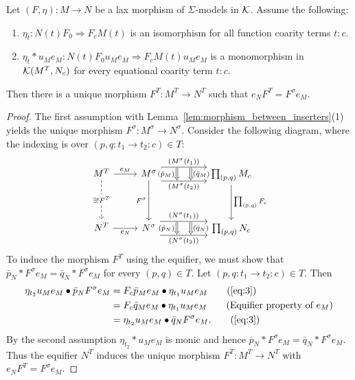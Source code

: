 \begin{theorem}\label{thm:induced_morphism_between_algebras}
   Let $(F,\eta)\colon M\to N$ be a lax morphism of $\Sigma$-models in $\mathcal{K}$. Assume the following:
\begin{enumerate}
   \item $\eta_t\colon N(t)F_0\Rightarrow F_cM(t)$ is an isomorphism for all function coarity terms $t\colon c$.
   \item $\eta_t*u_Me_M\colon N(t)F_0u_Me_M\Rightarrow F_cM(t)u_Me_M$ is a monomorphism in $\mathcal{K}(M^T,N_c)$ for every equational coarity term $t\colon c$.
\end{enumerate}
Then there is a unique morphism $F^T\colon M^T\to N^T$ such that $e_N F^T = F^\sigma e_M$.
\end{theorem}
\begin{proof}
   The first assumption with Lemma~\ref{lem:morphism_between_inserters}(1) yields the unique morphism $F^\sigma\colon M^\sigma\to N^\sigma$. Consider the following diagram, where the indexing is over $(p,q\colon t_1\to t_2\colon c)\in T$:
   \[
\begin{tikzcd}[ampersand replacement=\&]
 {M^T} \& {M^\sigma} \&\& {\prod_{(p,q)} M_c} \\
 \\
 {N^T} \& {N^\sigma} \&\& {\prod_{(p,q)} N_c}
 \arrow["{{{{e_M}}}}", from=1-1, to=1-2]
 \arrow["{{\exists! F^T}}"{description}, dashed, from=1-1, to=3-1]
 \arrow[""{name=0, anchor=center, inner sep=0}, "{{{{(M^\sigma(t_1))}}}}", shift left=3, from=1-2, to=1-4]
 \arrow[""{name=1, anchor=center, inner sep=0}, "{{{{(M^\sigma(t_2))}}}}"', shift right=3, from=1-2, to=1-4]
 \arrow["{{{F^\sigma}}}"', from=1-2, to=3-2]
 \arrow["{{{\prod_{(p,q)}F_c}}}", from=1-4, to=3-4]
 \arrow["{{e_N}}"', from=3-1, to=3-2]
 \arrow[""{name=2, anchor=center, inner sep=0}, "{{{{(N^\sigma(t_1))}}}}", shift left=3, from=3-2, to=3-4]
 \arrow[""{name=3, anchor=center, inner sep=0}, "{{{{(N^\sigma(t_2))}}}}"', shift right=3, from=3-2, to=3-4]
 \arrow["{{{{(\bar{p}_M)}}}}"', shift right=3, Rightarrow, from=0, to=1]
 \arrow["{{{{(\bar{q}_M)}}}}", shift left=3, Rightarrow, from=0, to=1]
 \arrow["{{{{(\bar{q}_N)}}}}", shift left=3, Rightarrow, from=2, to=3]
 \arrow["{{{{(\bar{p}_N)}}}}"', shift right=3, Rightarrow, from=2, to=3]
\end{tikzcd}
\]
   To induce the morphism $F^T$ using the equifier, we must show that $\bar{p}_N*F^\sigma e_M = \bar{q}_N*F^\sigma e_M$ for every $(p,q)\in T$. Let $(p,q\colon t_1\to t_2\colon c)\in T$. Then
   \begin{align*}
       \eta_{t_2}u_Me_M\bullet \bar{p}_NF^\sigma e_M
       &= F_c\bar{p}_Me_M\bullet \eta_{t_1}u_Me_M \tag{\eqref{eq:3}}\\
       &= F_c\bar{q}_Me_M\bullet \eta_{t_1}u_Me_M \tag{Equifier property of $e_M$}\\
       &= \eta_{t_2}u_Me_M\bullet \bar{q}_NF^\sigma e_M. \tag{\eqref{eq:3}}
   \end{align*}
   By the second assumption $\eta_{t_2}*u_Me_M$ is monic and hence $\bar{p}_N*F^\sigma e_M = \bar{q}_N*F^\sigma e_M$. Thus the equifier $N^T$ induces the unique morphism $F^T\colon M^T\to N^T$ with $e_NF^T = F^\sigma e_M$.
\end{proof}
